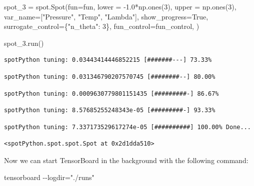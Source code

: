 \documentclass[
  letterpaper,
  DIV=11,
  numbers=noendperiod]{scrreprt}
\newenvironment{Shaded}{\begin{snugshade}}{\end{snugshade}}
\newcommand{\DecValTok}[1]{\textcolor[rgb]{0.68,0.00,0.00}{#1}}
\newcommand{\FloatTok}[1]{\textcolor[rgb]{0.68,0.00,0.00}{#1}}
\newcommand{\NormalTok}[1]{\textcolor[rgb]{0.00,0.23,0.31}{#1}}
\newcommand{\OperatorTok}[1]{\textcolor[rgb]{0.37,0.37,0.37}{#1}}
\newcommand{\StringTok}[1]{\textcolor[rgb]{0.13,0.47,0.30}{#1}}
\newcommand{\VariableTok}[1]{\textcolor[rgb]{0.07,0.07,0.07}{#1}}
\begin{document}
\begin{Shaded}
\begin{Highlighting}[]
\NormalTok{spot\_3 }\OperatorTok{=}\NormalTok{ spot.Spot(fun}\OperatorTok{=}\NormalTok{fun,}
\NormalTok{                   lower }\OperatorTok{=} \OperatorTok{{-}}\FloatTok{1.0}\OperatorTok{*}\NormalTok{np.ones(}\DecValTok{3}\NormalTok{),}
\NormalTok{                   upper }\OperatorTok{=}\NormalTok{ np.ones(}\DecValTok{3}\NormalTok{),}
\NormalTok{                   var\_name}\OperatorTok{=}\NormalTok{[}\StringTok{"Pressure"}\NormalTok{, }\StringTok{"Temp"}\NormalTok{, }\StringTok{"Lambda"}\NormalTok{],}
\NormalTok{                   show\_progress}\OperatorTok{=}\VariableTok{True}\NormalTok{,}
\NormalTok{                   surrogate\_control}\OperatorTok{=}\NormalTok{\{}\StringTok{"n\_theta"}\NormalTok{: }\DecValTok{3}\NormalTok{\},}
\NormalTok{                   fun\_control}\OperatorTok{=}\NormalTok{fun\_control,}
\NormalTok{              )}

\NormalTok{spot\_3.run()}
\end{Highlighting}
\end{Shaded}

\begin{verbatim}
spotPython tuning: 0.03443414446852215 [#######---] 73.33% 
\end{verbatim}

\begin{verbatim}
spotPython tuning: 0.031346790207570745 [########--] 80.00% 
\end{verbatim}

\begin{verbatim}
spotPython tuning: 0.0009630779801151435 [#########-] 86.67% 
\end{verbatim}

\begin{verbatim}
spotPython tuning: 8.57685255248343e-05 [#########-] 93.33% 
\end{verbatim}

\begin{verbatim}
spotPython tuning: 7.337173529617274e-05 [##########] 100.00% Done...
\end{verbatim}

\begin{verbatim}
<spotPython.spot.spot.Spot at 0x2d1dda510>
\end{verbatim}

Now we can start TensorBoard in the background with the following
command:

\begin{Shaded}
\begin{Highlighting}[]
\NormalTok{tensorboard {-}{-}logdir="./runs"}
\end{Highlighting}
\end{Shaded}
\end{document}

